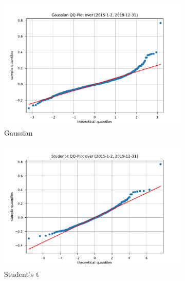 \begin{figure}[htbp]
    \centering
    \begin{subfigure}[b]{0.32\textwidth}
        \centering
        \includegraphics[width=\textwidth]{content/reschap4/Figures/gauss_QQ_2015-1-2-2019-12-31.pdf}
        \caption{\small Gaussian}
    \end{subfigure}
    \hfill
    \begin{subfigure}[b]{0.32\textwidth}
        \centering
        \includegraphics[width=\textwidth]{content/reschap4/Figures/student_QQ_2015-1-2-2019-12-31.pdf}
        \caption{\small Student's t}
    \end{subfigure}
    \hfill
    \begin{subfigure}[b]{0.32\textwidth}
        \centering

\end{subfigure}
\end{figure}
